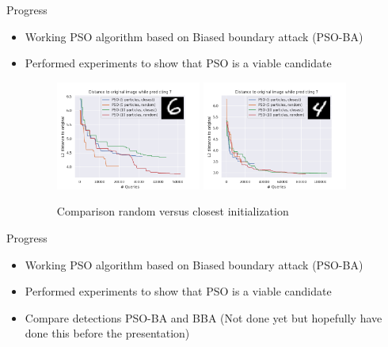 \documentclass[11pt,t]{beamer}
\begin{document}
\begin{frame}[plain]{Progress}
\begin{itemize}
	\item Working PSO algorithm based on Biased boundary attack (PSO-BA)
	\item Performed experiments to show that PSO is a viable candidate
	\begin{figure}
	\centering
	\includegraphics[width=0.45\textwidth]{graphics/random_vs_closest.png}
	\includegraphics[width=0.45\textwidth]{graphics/random_vs_closest_1.png}
	\caption{Comparison random versus closest initialization\label{fig:rand_vs_close}}
	\footnotesize
	\flushleft
	\end{figure}
\end{itemize}
\end{frame}

\begin{frame}{Progress}
\begin{itemize}
	\item Working PSO algorithm based on Biased boundary attack (PSO-BA)
	\item Performed experiments to show that PSO is a viable candidate
	\item Compare detections PSO-BA and BBA (Not done yet but hopefully have done this before the presentation)
\end{itemize}
\end{frame}
\end{document}
